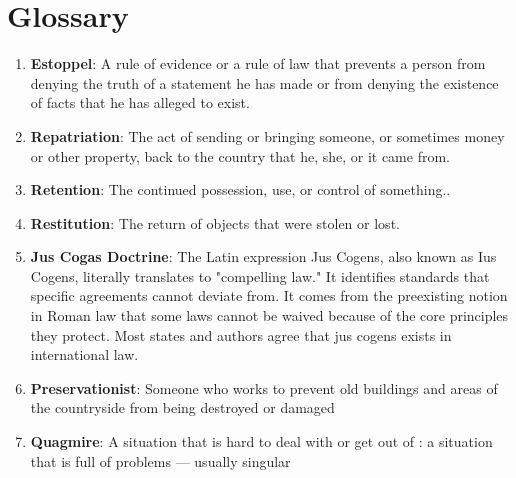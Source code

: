 \documentclass[12pt, letterpaper]{article}
\begin{document}
\pagebreak
\pagebreak
\section*{\huge\textbf{Glossary}}
\begin{enumerate}
    \item \textbf{Estoppel}: A rule of evidence or a rule of law that prevents a person from denying the truth of a statement he has made or from denying the existence of facts that he has alleged to exist.

    \item \textbf{Repatriation}: The act of sending or bringing someone, or sometimes money or other property, back to the country that he, she, or it came from.

    \item \textbf{Retention}: The continued possession, use, or control of something..
     
    \item \textbf{Restitution}: The return of objects that were stolen or lost.

    \item \textbf{Jus Cogas Doctrine}: The Latin expression Jus Cogens, also known as Ius Cogens, literally translates to "compelling law." It identifies standards that specific agreements cannot deviate from. It comes from the preexisting notion in Roman law that some laws cannot be waived because of the core principles they protect.  Most states and authors agree that jus cogens exists in international law.

    \item \textbf{Preservationist}: Someone who works to prevent old buildings and areas of the countryside from being destroyed or damaged

    \item \textbf{Quagmire}: A situation that is hard to deal with or get out of : a situation that is full of problems — usually singular
\end{enumerate}
\pagebreak

\end{document}
